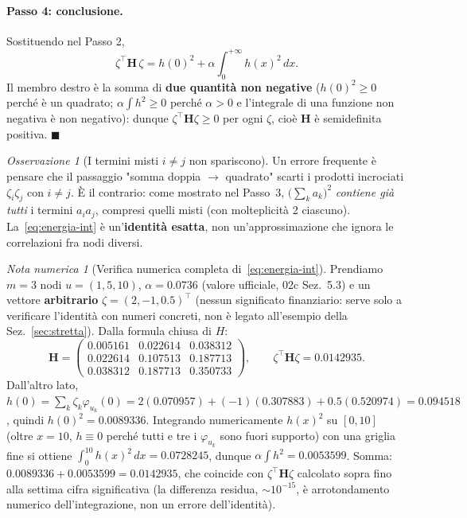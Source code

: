 \documentclass[11pt,a4paper]{article}
\theoremstyle{plain}
\theoremstyle{definition}
\theoremstyle{remark}
\newtheorem*{osservazione}{Osservazione}
\newtheorem*{attenzione}{Nota numerica}
\newcommand{\Hmat}{\mathbf{H}}
\newcommand{\transp}{^{\!\top}}
\begin{document}
\paragraph{Passo 4: conclusione.} Sostituendo nel Passo 2,
\begin{equation}
  \zeta\transp\Hmat\,\zeta = h(0)^2 + \alpha\!\int_0^{+\infty}\! h(x)^2\,dx .
  \label{eq:energia-int}
\end{equation}
Il membro destro è la somma di \textbf{due quantità non negative} ($h(0)^2\ge 0$ perché è un
quadrato; $\alpha\int h^2\ge 0$ perché $\alpha>0$ e l'integrale di una funzione non negativa è
non negativo): dunque $\zeta\transp\Hmat\zeta\ge 0$ per ogni $\zeta$, cioè $\Hmat$ è semidefinita
positiva. $\blacksquare$

\begin{osservazione}[I termini misti $i\neq j$ non spariscono]
Un errore frequente è pensare che il passaggio "somma doppia $\to$ quadrato" scarti i prodotti
incrociati $\zeta_i\zeta_j$ con $i\neq j$. È il contrario: come mostrato nel Passo~3,
$\bigl(\sum_k a_k\bigr)^2$ \emph{contiene già tutti} i termini $a_ia_j$, compresi quelli misti
(con molteplicità 2 ciascuno). La~\eqref{eq:energia-int} è un'\textbf{identità esatta}, non
un'approssimazione che ignora le correlazioni fra nodi diversi.
\end{osservazione}

\begin{attenzione}[Verifica numerica completa di~\eqref{eq:energia-int}]
Prendiamo $m=3$ nodi $u=(1,5,10)$, $\alpha=0.0736$ (valore ufficiale, 02c Sez.~5.3) e un vettore
\textbf{arbitrario} $\zeta=(2,-1,0.5)\transp$ (nessun significato finanziario: serve solo a
verificare l'identità con numeri concreti, non è legato all'esempio della Sez.~\ref{sec:stretta}).
Dalla formula chiusa di $H$:
\[
  \Hmat = \begin{pmatrix}
    0.005161 & 0.022614 & 0.038312\\
    0.022614 & 0.107513 & 0.187713\\
    0.038312 & 0.187713 & 0.350733
  \end{pmatrix},
  \qquad
  \zeta\transp\Hmat\zeta = 0.0142935 .
\]
Dall'altro lato, $h(0)=\sum_k\zeta_k\varphi_{u_k}(0) = 2(0.070957)+(-1)(0.307883)+0.5(0.520974)
= 0.094518$, quindi $h(0)^2=0.0089336$. Integrando numericamente $h(x)^2$ su $[0,10]$ (oltre
$x=10$, $h\equiv 0$ perché tutti e tre i $\varphi_{u_k}$ sono fuori supporto) con una griglia
fine si ottiene $\int_0^{10}h(x)^2\,dx = 0.0728245$, dunque $\alpha\int h^2 = 0.0053599$. Somma:
$0.0089336+0.0053599=0.0142935$, che coincide con $\zeta\transp\Hmat\zeta$ calcolato sopra fino
alla settima cifra significativa (la differenza residua, $\sim\!10^{-15}$, è arrotondamento
numerico dell'integrazione, non un errore dell'identità).
\end{attenzione}
\end{document}

